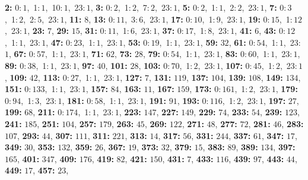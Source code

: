 \textsf{\bfseries 2:} 0:\,$1$,\ 1:\,$1$,\ 10:\,$1$,\ 23:\,$1$, \textsf{\bfseries 3:} 0:\,$2$,\ 1:\,$2$,\ 7:\,$2$,\ 23:\,$1$, \textsf{\bfseries 5:} 0:\,$2$,\ 1:\,$1$,\ 2:\,$2$,\ 23:\,$1$, \textsf{\bfseries 7:} 0:\,$3$,\ 1:\,$2$,\ 2:\,$5$,\ 23:\,$1$, \textsf{\bfseries 11:} $8$, \textsf{\bfseries 13:} 0:\,$11$,\ 3:\,$6$,\ 23:\,$1$, \textsf{\bfseries 17:} 0:\,$10$,\ 1:\,$9$,\ 23:\,$1$, \textsf{\bfseries 19:} 0:\,$15$,\ 1:\,$12$,\ 23:\,$1$, \textsf{\bfseries 23:} $7$, \textsf{\bfseries 29:} $15$, \textsf{\bfseries 31:} 0:\,$11$,\ 1:\,$6$,\ 23:\,$1$, \textsf{\bfseries 37:} 0:\,$17$,\ 1:\,$8$,\ 23:\,$1$, \textsf{\bfseries 41:} $6$, \textsf{\bfseries 43:} 0:\,$12$,\ 1:\,$1$,\ 23:\,$1$, \textsf{\bfseries 47:} 0:\,$23$,\ 1:\,$1$,\ 23:\,$1$, \textsf{\bfseries 53:} 0:\,$19$,\ 1:\,$1$,\ 23:\,$1$, \textsf{\bfseries 59:} $32$, \textsf{\bfseries 61:} 0:\,$54$,\ 1:\,$1$,\ 23:\,$1$, \textsf{\bfseries 67:} 0:\,$57$,\ 1:\,$1$,\ 23:\,$1$, \textsf{\bfseries 71:} $62$, \textsf{\bfseries 73:} $28$, \textsf{\bfseries 79:} 0:\,$54$,\ 1:\,$1$,\ 23:\,$1$, \textsf{\bfseries 83:} 0:\,$60$,\ 1:\,$1$,\ 23:\,$1$, \textsf{\bfseries 89:} 0:\,$38$,\ 1:\,$1$,\ 23:\,$1$, \textsf{\bfseries 97:} $40$, \textsf{\bfseries 101:} $28$, \textsf{\bfseries 103:} 0:\,$70$,\ 1:\,$2$,\ 23:\,$1$, \textsf{\bfseries 107:} 0:\,$45$,\ 1:\,$2$,\ 23:\,$1$, \textsf{\bfseries 109:} $42$, \textsf{\bfseries 113:} 0:\,$27$,\ 1:\,$1$,\ 23:\,$1$, \textsf{\bfseries 127:} $7$, \textsf{\bfseries 131:} $119$, \textsf{\bfseries 137:} $104$, \textsf{\bfseries 139:} $108$, \textsf{\bfseries 149:} $134$, \textsf{\bfseries 151:} 0:\,$133$,\ 1:\,$1$,\ 23:\,$1$, \textsf{\bfseries 157:} $84$, \textsf{\bfseries 163:} $11$, \textsf{\bfseries 167:} $159$, \textsf{\bfseries 173:} 0:\,$161$,\ 1:\,$2$,\ 23:\,$1$, \textsf{\bfseries 179:} 0:\,$94$,\ 1:\,$3$,\ 23:\,$1$, \textsf{\bfseries 181:} 0:\,$58$,\ 1:\,$1$,\ 23:\,$1$, \textsf{\bfseries 191:} $91$, \textsf{\bfseries 193:} 0:\,$116$,\ 1:\,$2$,\ 23:\,$1$, \textsf{\bfseries 197:} $27$, \textsf{\bfseries 199:} $68$, \textsf{\bfseries 211:} 0:\,$174$,\ 1:\,$1$,\ 23:\,$1$, \textsf{\bfseries 223:} $147$, \textsf{\bfseries 227:} $149$, \textsf{\bfseries 229:} $74$, \textsf{\bfseries 233:} $54$, \textsf{\bfseries 239:} $123$, \textsf{\bfseries 241:} $185$, \textsf{\bfseries 251:} $104$, \textsf{\bfseries 257:} $179$, \textsf{\bfseries 263:} $45$, \textsf{\bfseries 269:} $122$, \textsf{\bfseries 271:} $48$, \textsf{\bfseries 277:} $72$, \textsf{\bfseries 281:} $46$, \textsf{\bfseries 283:} $107$, \textsf{\bfseries 293:} $44$, \textsf{\bfseries 307:} $111$, \textsf{\bfseries 311:} $221$, \textsf{\bfseries 313:} $14$, \textsf{\bfseries 317:} $56$, \textsf{\bfseries 331:} $244$, \textsf{\bfseries 337:} $61$, \textsf{\bfseries 347:} $17$, \textsf{\bfseries 349:} $30$, \textsf{\bfseries 353:} $132$, \textsf{\bfseries 359:} $26$, \textsf{\bfseries 367:} $19$, \textsf{\bfseries 373:} $32$, \textsf{\bfseries 379:} $15$, \textsf{\bfseries 383:} $89$, \textsf{\bfseries 389:} $134$, \textsf{\bfseries 397:} $165$, \textsf{\bfseries 401:} $347$, \textsf{\bfseries 409:} $176$, \textsf{\bfseries 419:} $82$, \textsf{\bfseries 421:} $150$, \textsf{\bfseries 431:} $7$, \textsf{\bfseries 433:} $116$, \textsf{\bfseries 439:} $97$, \textsf{\bfseries 443:} $44$, \textsf{\bfseries 449:} $17$, \textsf{\bfseries 457:} $23$, 